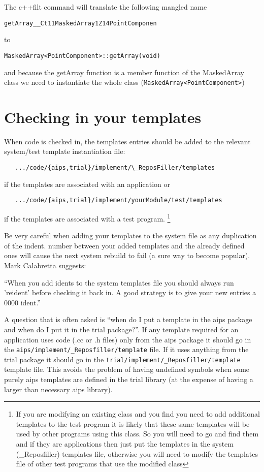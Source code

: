 The c++filt command will translate the following mangled name
\begin{verbatim}
getArray__Ct11MaskedArray1Z14PointComponen
\end{verbatim}
to
\begin{verbatim}
MaskedArray<PointComponent>::getArray(void) 
\end{verbatim}
and because the getArray function is a member function of the MaskedArray
class we need to instantiate the whole class 
(\texttt{MaskedArray<PointComponent>})

\section{Checking in your templates}

When code is checked in, the templates entries should be added to the
relevant system/test template instantiation file:
\begin{verbatim}
   .../code/{aips,trial}/implement/\_ReposFiller/templates
\end{verbatim}
if the templates are associated with an application or
\begin{verbatim}
   .../code/{aips,trial}/implement/yourModule/test/templates
\end{verbatim}
if the templates are associated with a test program. \footnote{If you are
  modifying an existing class and you find you need to add additional
  templates to the test program it is likely that these same templates will
  be used by other programs using this class. So you will need to go and
  find them and if they are applications then just put the templates in the
  system (\_Reposfiller) templates file, otherwise you will need to modify
  the templates file of other test programs that use the modified class}

Be very careful when adding your templates to the system file as any
duplication of the indent. number between your added templates
and the already defined ones will cause the next system rebuild to
fail (a sure way to become popular). Mark Calabretta suggests:

``When you add idents to the system templates file you should always run
'reident' before checking it back in.  A good strategy is to give your
new entries a 0000 ident.''

A question that is often asked is ``when do I put a template in the aips
package and when do I put it in the trial package?''. If any template
required for an application uses code (.cc or .h files) only from the aips
package it should go in the \texttt{aips/implement/\_Reposfiller/template}
file. If it uses anything from the trial package it should go in the
\texttt{trial/implement/\_Reposfiller/template} template file.  This avoids
the problem of having undefined symbols when some purely aips templates are
defined in the trial library (at the expense of having a larger than
necessary aips library).

